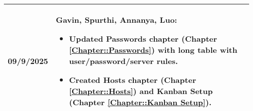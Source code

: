 \begin{longtable}{|l||p{13.5cm}|}
09/9/2025 & Gavin, Spurthi, Annanya, Luo:
\begin{itemize}[topsep=0pt,itemsep=0pt,parsep=0pt,partopsep=0pt,leftmargin=12pt]
\item Updated Passwords chapter (Chapter \ref{Chapter::Passwords}) with long table with user/password/server rules.
\item Created Hosts chapter (Chapter \ref{Chapter::Hosts}) and Kanban Setup (Chapter \ref{Chapter::Kanban Setup}).
\end{itemize} 
\\ \hline



\end{longtable}



